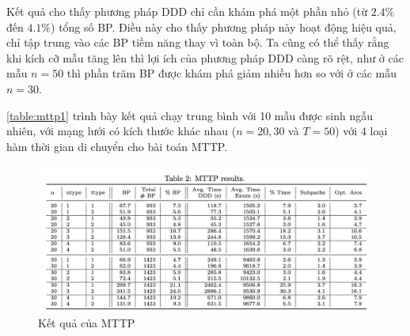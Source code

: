 \documentclass[../main.tex]{subfiles}
\begin{document}
Kết quả cho thấy phương pháp DDD chỉ cần khám phá một phần nhỏ (từ
\(2.4\%\) đến \(4.1\%\)) tổng số BP. Điều này cho thấy phương pháp này
hoạt động hiệu quả, chỉ tập trung vào các BP tiềm năng thay vì toàn bộ.
Ta cũng có thể thấy rằng khi kích cỡ mẫu tăng lên thì
lợi ích của phương pháp DDD càng rõ rệt, như ở các mẫu \(n=50\) thì phần trăm BP được khám phá
giảm nhiều hơn so với ở các mẫu \(n=30\).

\autoref{table:mttp1} trình bày kết quả chạy trung bình với 10 mẫu được sinh ngẫu
nhiên, với mạng lưới có kích thước khác nhau (\(n=20,30\) và \(T=50\))
với 4 loại hàm thời gian di chuyển cho bài toán MTTP.

\begin{figure}
\centering
\includegraphics{images/Table2.png}
\caption{Kết quả của MTTP}
\label{table:mttp1}
\end{figure}
\end{document}
